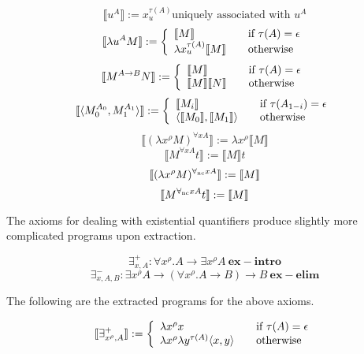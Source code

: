 \[ \llbracket u^A \rrbracket := x^{\tau (A)}_{u} \text{uniquely associated with $u^A$}
\]
\[
\llbracket \lambda u^A M \rrbracket := \left\{ 
\begin{array}{l l}
\llbracket M \rrbracket  & \quad \text{if $\tau (A) = \epsilon$} \\ 
\lambda x^{\tau (A)}_{u} \llbracket M \rrbracket & \quad \text{otherwise} \\
\end{array} \right.
 \]
\[
\llbracket M^{A \to B} N \rrbracket := \left\{ 
\begin{array}{l l}
\llbracket M \rrbracket  & \quad \text{if $\tau (A) = \epsilon$} \\ 
\llbracket M \rrbracket  \llbracket N \rrbracket & \quad \text{otherwise} \\
\end{array} \right.
 \]
\[
\llbracket \langle M^{A_0}_0, M^{A_1}_1 \rangle \rrbracket := \left\{ 
\begin{array}{l l}
\llbracket M_i \rrbracket  & \quad \text{if $\tau (A_{1-i}) = \epsilon$} \\ 
\langle \llbracket M_0 \rrbracket , \llbracket M_1 \rrbracket \rangle & \quad \text{otherwise} \\
\end{array} \right.
 \]
$$\llbracket ( \lambda x^{\rho} M)^{\forall x A} \rrbracket := \lambda x^{\rho} \llbracket   M \rrbracket$$
$$\llbracket M^{\forall x A} t \rrbracket := \llbracket M \rrbracket t$$
$$ \llbracket (\lambda x^{\rho} M)^{\forall_{\mathrm{nc}} x A} \rrbracket := \llbracket M \rrbracket $$
$$ \llbracket M^{\forall_{\mathrm{nc}} x A} t \rrbracket := \llbracket M \rrbracket  $$


The axioms for dealing with existential quantifiers produce slightly more
complicated programs upon extraction. 

$$ \exists^+_{x,A} : \forall x^{\rho}.A \to \exists x^{\rho} A  \ \mathbf{ex-intro}$$
$$ \exists^-_{x,A,B} : \exists x^{\rho} A \to (\forall x^{\rho}. A \to B) \to
B  \ \mathbf{ex-elim}$$

The following are the extracted programs for the above axioms.

\[ \llbracket \exists^{+}_{x^{\rho}, A} \rrbracket := \left\{ 
\begin{array}{l l}
\lambda x^{\rho} x  & \quad \text{if $\tau (A) = \epsilon$} \\ 
\lambda x^{\rho} \lambda y^{\tau (A)} \langle x,y \rangle & \quad \text{otherwise} \\

\end{array} \right.
\]

